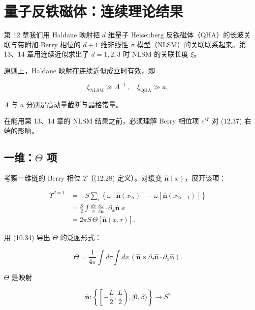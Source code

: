\chapter{量子反铁磁体：连续理论结果}

第 12 章我们用 Haldane 映射把 $d$ 维量子 Heisenberg 反铁磁体（QHA）的长波关联与带附加 Berry 相位的 $d+1$ 维非线性 {$\sigma$} 模型（NLSM）的关联联系起来。第 13、14 章用连续近似求出了 $d=1,2,3$ 时 NLSM 的关联长度 $\xi$。

原则上，Haldane 映射在连续近似成立时有效，即

\begin{equation*}
\xi_{\mathrm{NLSM}} \gg \Lambda^ {- 1} \, , \quad \xi_{\mathrm{QHA}} \gg a ,
\tag{15.1}
\end{equation*}

$\Lambda$ 与 $a$ 分别是高动量截断与晶格常量。

在能用第 13、14 章的 NLSM 结果之前，必须理解 Berry 相位项 $e^{i\Upsilon}$ 对 (12.37) 右端的影响。

\section{一维：$\Theta$ 项}

考察一维链的 Berry 相位 $\Upsilon$（(12.28) 定义）。对缓变 $\hat{\mathbf{n}}(x)$，展开该项：

\begin{align*}
\Upsilon^ {d = 1} & = - S \sum_ {i} \left\{ \omega [ \hat {\mathbf {n}} ( x _ {2i} ) ] - \omega [ \hat {\mathbf {n}} ( x _ {2i - 1} ) ] \right\}\\
& = \frac {S}{2} \int \frac {d x}{a} \, \frac {\delta \omega}{\delta \hat {\mathbf {n}}} \cdot \partial_ {x} \hat {\mathbf {n}} \; a\\
& = 2 \pi S \, \Theta [ \hat {\mathbf {n}} ( x, \tau ) ] .
\tag{15.2}
\end{align*}

用 (10.34) 导出 $\Theta$ 的泛函形式：

\begin{equation*}
\Theta = \frac {1}{4 \pi} \int d \tau \int d x \, \left( \hat {\mathbf {n}} \times \partial_ {\tau} \hat {\mathbf {n}} \cdot \partial_ {x} \hat {\mathbf {n}} \right).
\tag{15.3}
\end{equation*}

$\Theta$ 是映射

\begin{equation*}
\hat {\mathbf {n}} : \left\{ \left[ - \frac {L}{2}, \frac {L}{2} \right), [ 0, \beta ) \right\} \rightarrow S ^ {2}
\tag{15.4}
\end{equation*}

